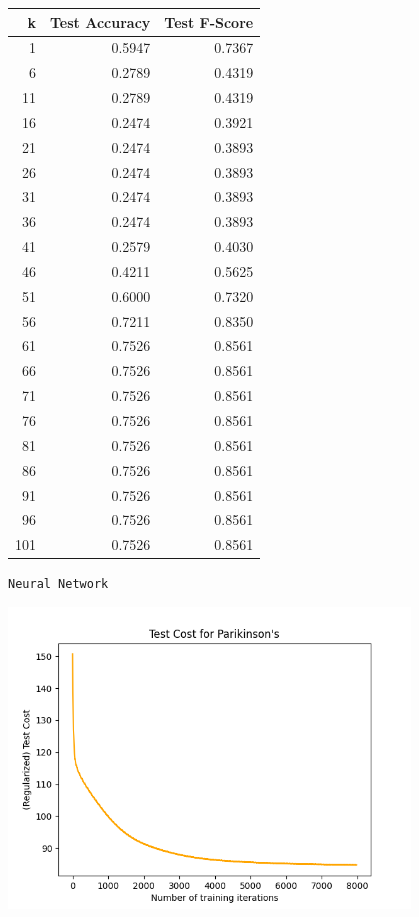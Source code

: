 \documentclass{article}
\begin{document}
\begin{minipage}{0.49\textwidth}
    \centering
    \begin{tabular}{rrr}
    \toprule
        k & Test Accuracy & Test F-Score \\
        \midrule
        1 & {0.5947} & {0.7367} \\
        6 & {0.2789} & {0.4319} \\
        11 & {0.2789} & {0.4319} \\
        16 & {0.2474} & {0.3921} \\
        21 & {0.2474} & {0.3893} \\
        26 & {0.2474} & {0.3893} \\
        31 & {0.2474} & {0.3893} \\
        36 & {0.2474} & {0.3893} \\
        41 & {0.2579} & {0.4030} \\
        46 & {0.4211} & {0.5625} \\
        51 & {0.6000} & {0.7320} \\
        56 & {0.7211} & {0.8350} \\
        61 & {0.7526} & {0.8561} \\
        66 & {0.7526} & {0.8561} \\
        71 & {0.7526} & {0.8561} \\
        76 & {0.7526} & {0.8561} \\
        81 & {0.7526} & {0.8561} \\
        86 & {0.7526} & {0.8561} \\
        91 & {0.7526} & {0.8561} \\
        96 & {0.7526} & {0.8561} \\
        101 & {0.7526} & {0.8561} \\
    \bottomrule
    \end{tabular}
\end{minipage}
\restoregeometry

\begin{center}
    \texttt{Neural Network}

    \includegraphics*[width=0.8\textwidth]{./src/figures/Parikinson's-test-cost.png}
\end{center}
\end{document}
